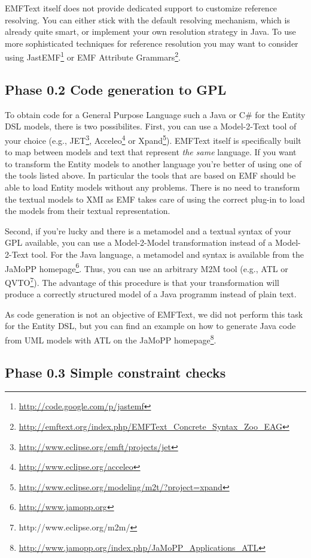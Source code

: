 \documentclass[10pt, pdftex]{llncs}
\begin{document}
EMFText itself does not provide dedicated support to customize reference
resolving. You can either stick with the default resolving mechanism, which is 
already quite smart, or implement your own resolution strategy in Java. To use
more sophisticated techniques for reference resolution you may want to consider
using JastEMF\footnote{\url{http://code.google.com/p/jastemf}} or EMF Attribute
Grammars\footnote{\url{http://emftext.org/index.php/EMFText\_Concrete\_Syntax\_Zoo\_EAG}}.

\subsection{Phase 0.2 Code generation to GPL}
\label{sec:phase-0-2}

To obtain code for a General Purpose Language such a Java or C\# for the
Entity DSL models, there is two possibilites. First, you can use a Model-2-Text tool of
your choice (e.g.,
JET\footnote{\url{http://www.eclipse.org/emft/projects/jet}},
Acceleo\footnote{\url{http://www.eclipse.org/acceleo}} or
Xpand\footnote{\url{http://www.eclipse.org/modeling/m2t/?project=xpand}}).
EMFText itself is specifically built to map between models and text that
represent \emph{the same} language. If you want to transform the Entity models
to another language you're better of using one of the tools listed above. In
particular the tools that are based on EMF should be able to load Entity models
without any problems. There is no need to transform the textual models to XMI as
EMF takes care of using the correct plug-in to load the models from their
textual representation.

Second, if you're lucky and there is a metamodel and a textual syntax of your
GPL available, you can use a Model-2-Model transformation instead of a
Model-2-Text tool. For the Java language, a metamodel and syntax is available
from the JaMoPP homepage\footnote{\url{http://www.jamopp.org}}. Thus, you can
use an arbitrary M2M tool (e.g., ATL or
QVTO\footnote{http://www.eclipse.org/m2m/}). The advantage of this procedure is
that your transformation will produce a correctly structured model of a Java
programm instead of plain text.

As code generation is not an objective of EMFText, we did not perform this task
for the Entity DSL, but you can find an example on how to generate Java code
from UML models with ATL on the JaMoPP
homepage\footnote{\url{http://www.jamopp.org/index.php/JaMoPP\_Applications\_ATL}}.

\subsection{Phase 0.3 Simple constraint checks}
\label{sec:phase-0-3}
\end{document}
